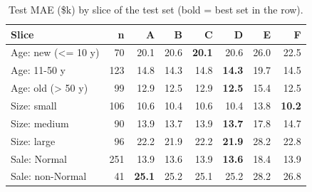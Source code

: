 \begin{table}[t]
\centering
\small
\begin{tabular}{lrrrrrrr}
\toprule
Slice & n & A & B & C & D & E & F \\
\midrule
Age: new (<= 10 y) & 70 & 20.1 & 20.6 & \textbf{20.1} & 20.6 & 26.0 & 22.5 \\
Age: 11-50 y & 123 & 14.8 & 14.3 & 14.8 & \textbf{14.3} & 19.7 & 14.5 \\
Age: old (> 50 y) & 99 & 12.9 & 12.5 & 12.9 & \textbf{12.5} & 15.4 & 12.5 \\
Size: small & 106 & 10.6 & 10.4 & 10.6 & 10.4 & 13.8 & \textbf{10.2} \\
Size: medium & 90 & 13.9 & 13.7 & 13.9 & \textbf{13.7} & 17.8 & 14.7 \\
Size: large & 96 & 22.2 & 21.9 & 22.2 & \textbf{21.9} & 28.2 & 22.8 \\
Sale: Normal & 251 & 13.9 & 13.6 & 13.9 & \textbf{13.6} & 18.4 & 13.9 \\
Sale: non-Normal & 41 & \textbf{25.1} & 25.2 & 25.1 & 25.2 & 28.2 & 26.8 \\
\bottomrule
\end{tabular}
\caption{Test MAE (\$k) by slice of the test set (bold = best set in the row).}
\label{tab:ablation_slices}
\end{table}
